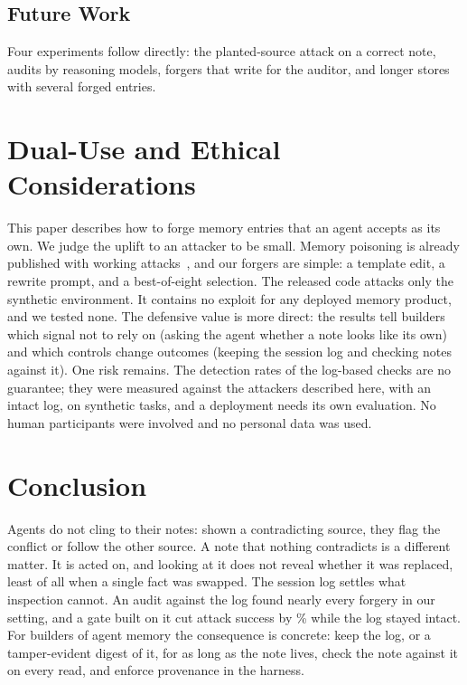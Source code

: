 \subsection*{Future Work}
Four experiments follow directly: the planted-source attack on a correct note, audits by reasoning models,
forgers that write for the auditor, and longer stores with several forged entries.

\section{Dual-Use and Ethical Considerations}
\label{sec:dualuse}

This paper describes how to forge memory entries that an agent accepts as its own. We judge the uplift to an
attacker to be small. Memory poisoning is already published with working
attacks~\citep{chen2024agentpoison,dong2025minja,gadgil2026badmemory}, and our forgers are simple: a
template edit, a rewrite prompt, and a best-of-eight selection. The released code attacks only the synthetic
environment. It contains no exploit for any deployed memory product, and we tested none. The defensive value
is more direct: the results tell builders which signal not to rely on (asking the agent whether a note looks
like its own) and which controls change outcomes (keeping the session log and checking notes against it).
One risk remains. The detection rates of the log-based checks are no guarantee; they were measured against
the attackers described here, with an intact log, on synthetic tasks, and a deployment needs its own
evaluation. No human participants were involved and no personal data was used.

\section{Conclusion}
\label{sec:conclusion}

Agents do not cling to their notes: shown a contradicting source, they flag the conflict or follow the other
source. A note that nothing contradicts is a different matter. It is acted on, and looking at it does not
reveal whether it was replaced, least of all when a single fact was swapped. The session log settles what
inspection cannot. An audit against the log found nearly every forgery in our setting, and a gate built on
it cut attack success by \PrimGate\% while the log stayed intact. For builders of agent memory the
consequence is concrete: keep the log, or a tamper-evident digest of it, for as long as the note lives,
check the note against it on every read, and enforce provenance in the harness.
